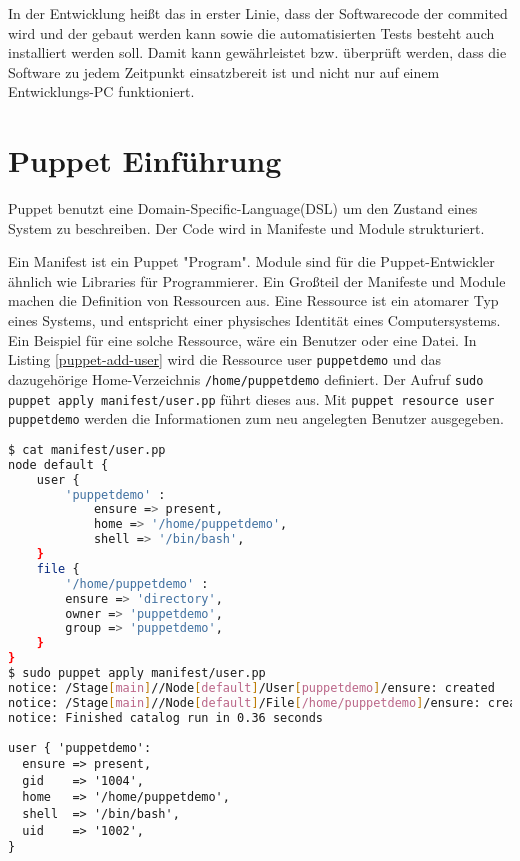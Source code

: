 \documentclass[12pt,a4paper,ngerman]{article}
\begin{document}
In der Entwicklung heißt das in erster Linie, dass der Softwarecode der commited wird und  der gebaut werden kann sowie die automatisierten Tests besteht auch installiert werden soll. Damit kann gewährleistet bzw. überprüft werden, dass die Software zu jedem Zeitpunkt einsatzbereit ist und nicht nur auf einem Entwicklungs-PC funktioniert.

\section{Puppet Einführung}

Puppet benutzt eine Domain-Specific-Language(DSL) um den Zustand eines System zu beschreiben. Der Code wird in Manifeste und Module strukturiert.

Ein Manifest ist ein Puppet "Program". Module sind für die Puppet-Entwickler ähnlich wie Libraries für Programmierer. Ein Großteil der Manifeste und Module machen die Definition von Ressourcen aus. Eine Ressource ist ein atomarer Typ eines Systems, und entspricht einer physisches Identität eines Computersystems. Ein Beispiel für eine solche Ressource, wäre ein Benutzer oder eine Datei. In Listing \ref{puppet-add-user} wird die Ressource user \lstinline$puppetdemo$ und das dazugehörige Home-Verzeichnis \lstinline$/home/puppetdemo$ definiert. Der Aufruf \lstinline$sudo puppet apply manifest/user.pp$ führt dieses aus. Mit \lstinline$puppet resource user puppetdemo$ werden die Informationen zum neu angelegten Benutzer ausgegeben.


\begin{lstlisting}[language=sh,caption=User mit Puppet anlegen, label=puppet-add-user]
$ cat manifest/user.pp 
node default {
    user {
        'puppetdemo' :
            ensure => present,
            home => '/home/puppetdemo',
            shell => '/bin/bash',
    }
    file {
        '/home/puppetdemo' :
        ensure => 'directory',
        owner => 'puppetdemo',
        group => 'puppetdemo',
    }
}
$ sudo puppet apply manifest/user.pp 
notice: /Stage[main]//Node[default]/User[puppetdemo]/ensure: created
notice: /Stage[main]//Node[default]/File[/home/puppetdemo]/ensure: created
notice: Finished catalog run in 0.36 seconds
\end{lstlisting}
\begin{lstlisting}[language=puppet,caption=Anzeige der Benutzerinformation in Puppet, label=puppet-add-user-info]
user { 'puppetdemo':
  ensure => present,
  gid    => '1004',
  home   => '/home/puppetdemo',
  shell  => '/bin/bash',
  uid    => '1002',
}
\end{lstlisting}
\end{document}
